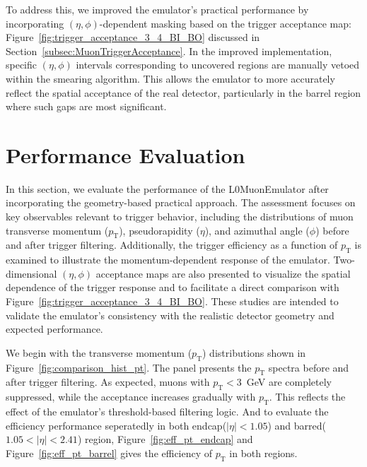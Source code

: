 To address this, we improved the emulator's practical performance by incorporating $(\eta, \phi)$-dependent masking based on the trigger acceptance map: Figure~\ref{fig:trigger_acceptance_3_4_BI_BO} discussed in Section~\ref{subsec:MuonTriggerAcceptance}. In the improved implementation, specific $(\eta, \phi)$ intervals corresponding to uncovered regions are manually vetoed within the smearing algorithm. This allows the emulator to more accurately reflect the spatial acceptance of the real detector, particularly in the barrel region where such gaps are most significant.


\section{Performance Evaluation} \label{sec:L0MuonEmulatorPerformance}
In this section, we evaluate the performance of the L0MuonEmulator after incorporating the geometry-based practical approach. The assessment focuses on key observables relevant to trigger behavior, including the distributions of muon transverse momentum ($p_\mathrm{T}$), pseudorapidity ($\eta$), and azimuthal angle ($\phi$) before and after trigger filtering. Additionally, the trigger efficiency as a function of $p_\mathrm{T}$ is examined to illustrate the momentum-dependent response of the emulator. Two-dimensional $(\eta, \phi)$ acceptance maps are also presented to visualize the spatial dependence of the trigger response and to facilitate a direct comparison with Figure~\ref{fig:trigger_acceptance_3_4_BI_BO}. These studies are intended to validate the emulator's consistency with the
realistic detector geometry and expected performance.

We begin with the transverse momentum ($p_\mathrm{T}$) distributions shown in Figure~\ref{fig:comparison_hist_pt}. The panel presents the $p_\mathrm{T}$ spectra before and after trigger filtering. As expected, muons with $p_\mathrm{T} < 3$~GeV are completely suppressed, while the acceptance increases gradually with $p_\mathrm{T}$. This reflects the effect of the emulator’s threshold-based filtering logic. And to evaluate the efficiency performance seperatedly in both endcap($|\eta| < 1.05$) and barred($1.05 < |\eta| < 2.41$) region, Figure~\ref{fig:eff_pt_endcap} and Figure~\ref{fig:eff_pt_barrel} gives the efficiency of $p_\mathrm{T}$ in both regions.


